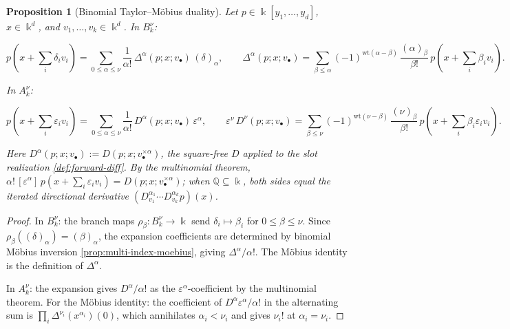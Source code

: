 \documentclass[10pt,a4paper]{article}
\theoremstyle{plain}
\newtheorem{proposition}[theorem]{Proposition}
\theoremstyle{definition}
\newcommand{\IQ}{\mathbb{Q}} %
\newcommand{\ik}{\Bbbk} %
\newcommand{\1}{\mathbb{1}} %
\newcommand{\eps}{\varepsilon} %
\begin{document}
\begin{proposition}[Binomial Taylor--Möbius duality]

\label{prop:binomial-taylor-duality} Let \(p \in \ik[y_1, \dots, y_d]\),
\(x \in \ik^d\), and \(v_1, \dots, v_k \in \ik^d\). In \(B_k^\nu\):

\[
  p(x + {\textstyle\sum_i} \delta_i v_i) = \sum_{0 \leq \alpha \leq \nu} \frac{1}{\alpha!}\, \Delta^\alpha(p; x; v_\bullet)\, (\delta)_\alpha, \qquad \Delta^\alpha(p; x; v_\bullet) = \sum_{\beta \leq \alpha} (-1)^{\mathrm{wt}(\alpha-\beta)}\, \frac{(\alpha)_\beta}{\beta!}\, p(x + {\textstyle\sum_i} \beta_i v_i).
\]

In \(A_k^\nu\):

\[
  p(x + {\textstyle\sum_i} \eps_i v_i) = \sum_{0 \leq \alpha \leq \nu} \frac{1}{\alpha!}\, D^\alpha(p; x; v_\bullet)\, \eps^\alpha, \qquad \eps^\nu\, D^\nu(p; x; v_\bullet) = \sum_{\beta \leq \nu} (-1)^{\mathrm{wt}(\nu-\beta)}\, \frac{(\nu)_\beta}{\beta!}\, p(x + {\textstyle\sum_i} \beta_i \eps_i v_i).
\]

Here
\(D^\alpha(p; x; v_\bullet) := D(p; x; v_\bullet^{\times \alpha})\), the
square-free \(D\) applied to the slot realization
\ref{def:forward-diff}. By the multinomial theorem,
\(\alpha!\, [\eps^\alpha]\, p(x + \sum_i \eps_i v_i) = D(p; x; v_\bullet^{\times \alpha})\);
when \(\IQ \subseteq \ik\), both sides equal the iterated directional
derivative \((D_{v_1}^{\alpha_1} \cdots D_{v_k}^{\alpha_k} p)(x)\).

\end{proposition}

\begin{proof}

In \(B_k^\nu\): the branch maps \(\rho_\beta: B_k^\nu \to \ik\) send
\(\delta_i \mapsto \beta_i\) for \(0 \leq \beta \leq \nu\). Since
\(\rho_\beta((\delta)_\alpha) = (\beta)_\alpha\), the expansion
coefficients are determined by binomial Möbius inversion
\ref{prop:multi-index-moebius}, giving \(\Delta^\alpha / \alpha!\). The
Möbius identity is the definition of \(\Delta^\alpha\).

In \(A_k^\nu\): the expansion gives \(D^\alpha / \alpha!\) as the
\(\eps^\alpha\)-coefficient by the multinomial theorem. For the Möbius
identity: the coefficient of \(D^\alpha \eps^\alpha / \alpha!\) in the
alternating sum is \(\prod_i \Delta^{\nu_i}(x^{\alpha_i})(0)\), which
annihilates \(\alpha_i < \nu_i\) and gives \(\nu_i!\) at
\(\alpha_i = \nu_i\).

\end{proof}
\end{document}
